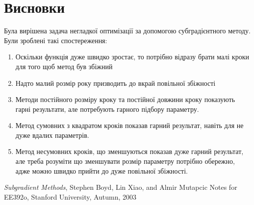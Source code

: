 \documentclass[a4paper, 14pt]{extarticle}
\begin{document}
\section{Висновки}
Була вирішена задача негладкої оптимізації за допомогою субградієнтного
методу. Були зроблені такі спостереження:
\begin{enumerate}
    \item Оскільки функція дуже швидко зростає, то 
    потрібно відразу брати малі кроки для того щоб метод був збіжний
    \item Надто малий розмір року призводить до вкрай повільної збіжності
    \item Методи постійного розміру кроку та 
    постійної довжини кроку показують гарні результати, але потребують 
    гарного підбору параметру.
    \item Метод сумовних з квадратом кроків показав гарний результат,
    навіть для не дуже вдалих параметрів.
    \item Метод несумовних кроків, що зменшуються показав 
    дуже гарний результат, але треба розуміти що зменшувати розмір 
    параметру потрібно обережно, адже можно швидко 
    прийти до дуже повільної збіжності.
\end{enumerate}
\newpage
\begin{thebibliography}{1}
\emph{Subgradient Methods},
Stephen Boyd, Lin Xiao, and Almir Mutapcic
Notes for EE392o, Stanford University, Autumn, 2003
\end{thebibliography}
\newpage
\end{document}
